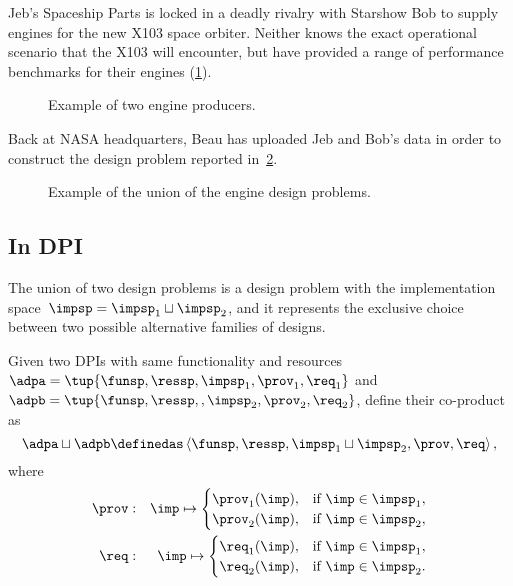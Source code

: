 \begin{example}
  Jeb's Spaceship Parts is locked in a deadly rivalry with Starshow Bob to supply engines for the new X103 space orbiter. Neither knows the exact operational scenario that the X103 will encounter, but have provided a range of performance benchmarks for their engines (\cref{fig:exunion_1}).
  \begin{figure}[h!]
    \begin{center}
    \end{center}
    \caption{Example of two engine producers. }
    \label{fig:exunion_1}
  \end{figure}
  Back at NASA headquarters, Beau has uploaded Jeb and Bob's data in order to construct the design problem reported in~\cref{fig:exunion_2}.
  \begin{figure}[h!]
    \begin{center}
    \end{center}
    \caption{Example of the union of the engine design problems. }
    \label{fig:exunion_2}
  \end{figure}
\end{example}

\subsection{In DPI}\label{subsec:dpi-union}


The union of two design problems is a design problem with the implementation
space~$\impsp=\impsp_{1}\sqcup\impsp_{2}$, and it represents the
exclusive choice between two possible alternative families of designs.
\begin{definition}[Coproduct]
  \label{def:parallel-1}Given two DPIs with same functionality and
  resources~$\adpa=\tup{\funsp,\ressp,\impsp_{1},\prov_{1},\req_{1}}$
  and~$\adpb=\tup{\funsp,\ressp,,\impsp_{2},\prov_{2},\req_{2}}$,
  define their co-product as
  \begin{equation}
    \adpa\sqcup\adpb\definedas\left\langle \funsp,\ressp,\impsp_{1}\sqcup\impsp_{2},\prov,\req\right\rangle ,
  \end{equation}
  where
  \begin{eqnarray}
    \prov & : & \imp\mapsto\begin{cases}
                             \prov_{1}(\imp), & \text{if }\imp\in\impsp_{1},\\
                             \prov_{2}(\imp), & \text{if }\imp\in\impsp_{2},
    \end{cases}\label{eq:dppar-exec-1}\\
    \req & : & \imp\mapsto\begin{cases}
                            \req_{1}(\imp), & \text{if }\imp\in\impsp_{1},\\
                            \req_{2}(\imp), & \text{if }\imp\in\impsp_{2}.
    \end{cases}\nonumber
  \end{eqnarray}
\end{definition}

